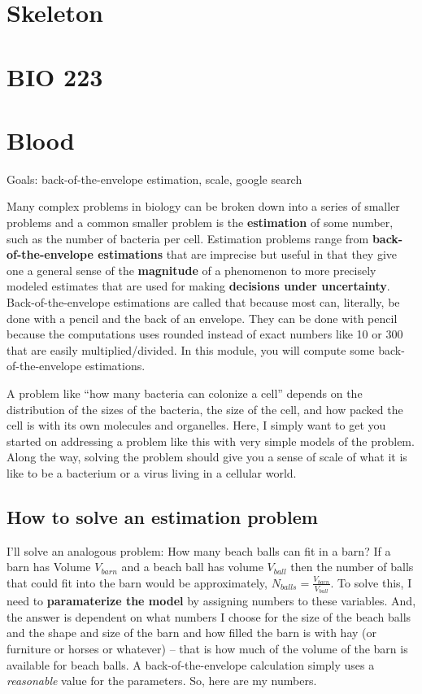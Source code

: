 \documentclass[]{book}
\begin{document}
\chapter{Skeleton}\label{skeleton}

\chapter*{BIO 223}\label{bio-223}

\chapter{Blood}\label{blood}

Goals: back-of-the-envelope estimation, scale, google search

Many complex problems in biology can be broken down into a series of
smaller problems and a common smaller problem is the \textbf{estimation}
of some number, such as the number of bacteria per cell. Estimation
problems range from \textbf{back-of-the-envelope estimations} that are
imprecise but useful in that they give one a general sense of the
\textbf{magnitude} of a phenomenon to more precisely modeled estimates
that are used for making \textbf{decisions under uncertainty}.
Back-of-the-envelope estimations are called that because most can,
literally, be done with a pencil and the back of an envelope. They can
be done with pencil because the computations uses rounded instead of
exact numbers like 10 or 300 that are easily multiplied/divided. In this
module, you will compute some back-of-the-envelope estimations.

A problem like ``how many bacteria can colonize a cell'' depends on the
distribution of the sizes of the bacteria, the size of the cell, and how
packed the cell is with its own molecules and organelles. Here, I simply
want to get you started on addressing a problem like this with very
simple models of the problem. Along the way, solving the problem should
give you a sense of scale of what it is like to be a bacterium or a
virus living in a cellular world.

\section{How to solve an estimation
problem}\label{how-to-solve-an-estimation-problem}

I'll solve an analogous problem: How many beach balls can fit in a barn?
If a barn has Volume \(V_{barn}\) and a beach ball has volume
\(V_{ball}\) then the number of balls that could fit into the barn would
be approximately, \(N_{balls} = \frac{V_{barn}}{V_{ball}}\). To solve
this, I need to \textbf{paramaterize the model} by assigning numbers to
these variables. And, the answer is dependent on what numbers I choose
for the size of the beach balls and the shape and size of the barn and
how filled the barn is with hay (or furniture or horses or whatever) --
that is how much of the volume of the barn is available for beach balls.
A back-of-the-envelope calculation simply uses a \emph{reasonable} value
for the parameters. So, here are my numbers.
\end{document}
